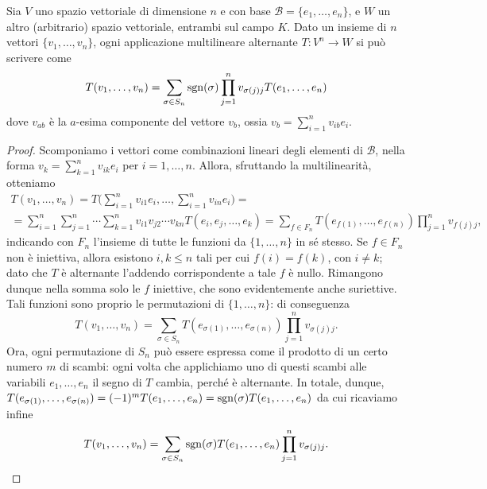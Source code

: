 \begin{lemma}
	Sia $V$ uno spazio vettoriale di dimensione $n$ e con base $\mathcal B=\{e_1,\dots,e_n\}$, e $W$ un altro (arbitrario) spazio vettoriale, entrambi sul campo $K$.
	Dato un insieme di $n$ vettori $\{v_1,\dots,v_n\}$, ogni applicazione multilineare alternante $T\colon V^n\to W$ si può scrivere come
	\begin{equation}
		T(v_1,\dots,v_n)=\sum_{\sigma\in S_n}\operatorname{sgn}(\sigma)\prod_{j=1}^nv_{\sigma(j)j}T(e_1,\dots,e_n)
	\end{equation}
	dove $v_{ab}$ è la $a$-esima componente del vettore $v_b$, ossia $v_b=\sum_{i=1}^nv_{ib}e_i$.
\end{lemma}
\begin{proof}
	Scomponiamo i vettori come combinazioni lineari degli elementi di $\mathcal B$, nella forma $v_k=\sum_{k=1}^nv_{ik}e_i$ per $i=1,\dots,n$.
	Allora, sfruttando la multilinearità, otteniamo
	\begin{multline}
		T(v_1,\dots,v_n)=
		T\bigg(\sum_{i=1}^nv_{i1}e_i,\dots,\sum_{i=1}^nv_{in}e_i\bigg)=\\=
		\sum_{i=1}^n\sum_{j=1}^n\cdots\sum_{k=1}^nv_{i1}v_{j2}\cdots v_{kn}T(e_i,e_j,\dots,e_k)=
		\sum_{f\in F_n}T(e_{f(1)},\dots,e_{f(n)})\prod_{j=1}^nv_{f(j)j},
	\end{multline}
	indicando con $F_n$ l'insieme di tutte le funzioni da $\{1,\dots,n\}$ in s\'e stesso.
	Se $f\in F_n$ non è iniettiva, allora esistono $i,k\le n$ tali per cui $f(i)=f(k)$, con $i\ne k$; dato che $T$ è alternante l'addendo corrispondente a tale $f$ è nullo.
	Rimangono dunque nella somma solo le $f$ iniettive, che sono evidentemente anche suriettive.
	Tali funzioni sono proprio le permutazioni di $\{1,\dots,n\}$: di conseguenza
	\begin{equation}
		T(v_1,\dots,v_n)=\sum_{\sigma\in S_n}T(e_{\sigma(1)},\dots,e_{\sigma(n)})\prod_{j=1}^nv_{\sigma(j)j}.
	\end{equation}
	Ora, ogni permutazione di $S_n$ può essere espressa come il prodotto di un certo numero $m$ di scambi: ogni volta che applichiamo uno di questi scambi alle variabili $e_1,\dots,e_n$ il segno di $T$ cambia, perch\'e è alternante.
	In totale, dunque, $T(e_{\sigma(1)},\dots,e_{\sigma(n)})=(-1)^mT(e_1,\dots,e_n)=\operatorname{sgn}(\sigma)T(e_1,\dots,e_n)$ da cui ricaviamo infine
	\begin{equation}
		T(v_1,\dots,v_n)=\sum_{\sigma\in S_n}\operatorname{sgn}(\sigma)T(e_1,\dots,e_n)\prod_{j=1}^nv_{\sigma(j)j}.\qedhere
	\end{equation}
\end{proof}

